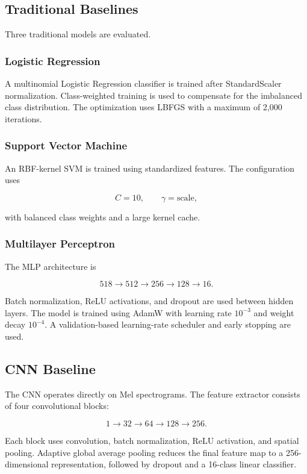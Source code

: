\documentclass[11pt,a4paper]{article}
\begin{document}
\subsection{Traditional Baselines}

Three traditional models are evaluated.

\subsubsection{Logistic Regression}

A multinomial Logistic Regression classifier is trained after StandardScaler normalization. Class-weighted training is used to compensate for the imbalanced class distribution. The optimization uses LBFGS with a maximum of 2,000 iterations.

\subsubsection{Support Vector Machine}

An RBF-kernel SVM is trained using standardized features. The configuration uses

\[
C=10,\qquad \gamma=\text{scale},
\]

with balanced class weights and a large kernel cache.

\subsubsection{Multilayer Perceptron}

The MLP architecture is

\[
518 \rightarrow 512 \rightarrow 256 \rightarrow 128 \rightarrow 16.
\]

Batch normalization, ReLU activations, and dropout are used between hidden layers. The model is trained using AdamW with learning rate \(10^{-3}\) and weight decay \(10^{-4}\). A validation-based learning-rate scheduler and early stopping are used.

\subsection{CNN Baseline}

The CNN operates directly on Mel spectrograms. The feature extractor consists of four convolutional blocks:

\[
1\rightarrow32\rightarrow64\rightarrow128\rightarrow256.
\]

Each block uses convolution, batch normalization, ReLU activation, and spatial pooling. Adaptive global average pooling reduces the final feature map to a 256-dimensional representation, followed by dropout and a 16-class linear classifier.
\end{document}
